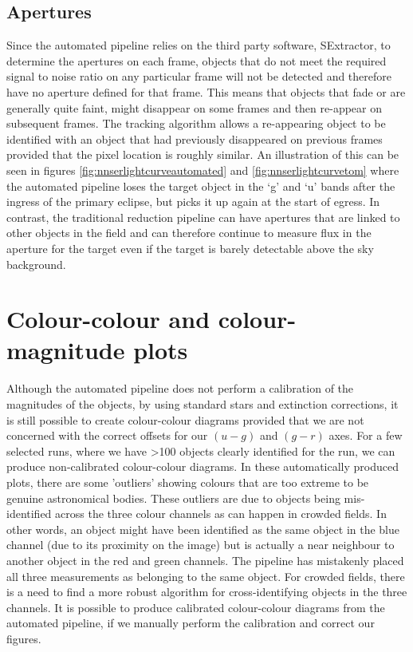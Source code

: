 \subsection{Apertures}
Since the automated pipeline relies on the third party software, SExtractor, to determine the apertures on each frame, objects that do not meet the required signal to noise ratio on any particular frame will not be detected and therefore have no aperture defined for that frame. This means that objects that fade or are generally quite faint, might disappear on some frames and then re-appear on subsequent frames. The tracking algorithm allows a re-appearing object to be identified with an object that had previously disappeared on previous frames provided that the pixel location is roughly similar. An illustration of this can be seen in figures \ref{fig:nnserlightcurveautomated} and \ref{fig:nnserlightcurvetom} where the automated pipeline loses the target object in the `g' and `u' bands after the ingress of the primary eclipse, but picks it up again at the start of egress. In contrast, the traditional reduction pipeline can have apertures that are linked to other objects in the field and can therefore continue to measure flux in the aperture for the target even if the target is barely detectable above the sky background.

\section{Colour-colour and colour-magnitude plots}
Although the automated pipeline does not perform a calibration of the magnitudes of the objects, by using standard stars and extinction corrections, it is still possible to create colour-colour diagrams provided that we are not concerned with the correct offsets for our $(u-g)$ and $(g-r)$ axes. For a few selected runs, where we have \textgreater 100 objects clearly identified for the run, we can produce non-calibrated colour-colour diagrams. In these automatically produced plots, there are some 'outliers' showing colours that are too extreme to be genuine astronomical bodies. These outliers are due to objects being mis-identified across the three colour channels as can happen in crowded fields. In other words, an object might have been identified as the same object in the blue channel (due to its proximity on the image) but is actually a near neighbour to another object in the red and green channels. The pipeline has mistakenly placed all three measurements as belonging to the same object. For crowded fields, there is a need to find a more robust algorithm for cross-identifying objects in the three channels. It is possible to produce calibrated colour-colour diagrams from the automated pipeline, if we manually perform the calibration and correct our figures. 


